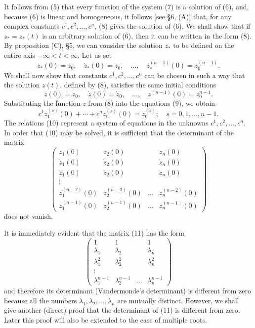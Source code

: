 \documentclass[10pt,a5paper]{book}
\makeatletter
\theoremstyle{plain}
\theoremstyle{definition}
\theoremstyle{remark}
\renewenvironment{proof}[1][\proofname]{\par
  \pushQED{\qed}%
  \normalfont\topsep6\p@\@plus6\p@\relax
  \trivlist
  \item\relax{\itshape #1\@addpunct{.}}\hspace\labelsep\ignorespaces
}{\popQED\endtrivlist\@endpefalse}
\makeatother
\begin{document}
\begin{proof}
It follows from (5) that every function of the system (7) is a solution of (6), and, because (6) is linear and homogeneous, it follows [see §6, (A)] that, for any complex constants $c^{1}, c^{2}, \ldots, c^{n}$, (8) gives the solution of (6). We shall show that if $z_{*}=z_{*}(t)$ is an arbitrary solution of (6), then it can be written in the form (8). By proposition (C), §5, we can consider the solution $z_{*}$ to be defined on the entire axis $-\infty<t<\infty$. Let us set
\[
z_{*}(0)=z_{0}, \quad \dot{z}_{*}(0)=\dot{z}_{0}, \quad \ldots, \quad z_{*}^{(n-1)}(0)=z_{0}^{(n-1)} .
\]
We shall now show that constants $c^{1}, c^{2}, \ldots, c^{n}$ can be chosen in such a way that the solution $z(t)$, defined by (8), satisfies the same initial conditions
\begin{equation*}
z(0)=z_{0}, \quad \dot{z}(0)=\dot{z}_{0}, \quad \ldots, \quad z^{(n-1)}(0)=z_{0}^{n-1} . \tag{9}
\end{equation*}
Substituting the function $z$ from (8) into the equations (9), we obtain
\begin{equation*}
c^{1} z_{1}^{(s)}(0)+\cdots+c^{n} z_{n}^{(s)}(0)=z_{0}^{(s)} ; \quad s=0,1, \ldots, n-1 . \tag{10}
\end{equation*}
The relations (10) represent a system of equations in the unknowns $c^{1}, c^{2}, \ldots, c^{n}$. In order that (10) may be solved, it is sufficient that the
determinant of the matrix
\[
\left(\begin{array}{cccc}
z_{1}(0) & z_{2}(0) & & z_{n}(0)  \tag{11}\\
\dot{z}_{1}(0) & \dot{z}_{2}(0) & & \dot{z}_{n}(0) \\
\ddot{z}_{1}(0) & \ddot{z}_{2}(0) & & \ddot{z}_{n}(0) \\
\vdots & & & \\
z_{1}^{(n-2)}(0) & z_{2}^{(n-2)}(0) & \ldots & z_{n}^{(n-2)}(0) \\
z_{1}^{(n-1)}(0) & z_{2}^{(n-1)}(0) & \ldots & z_{n}^{(n-1)}(0)
\end{array}\right)
\]
does not vanish.

It is immediately evident that the matrix (11) has the form
\[
\left(\begin{array}{cccc}
1 & 1 & & 1 \\
\lambda_{1} & \lambda_{2} & & \lambda_{n} \\
\lambda_{1}^{2} & \lambda_{2}^{2} & & \lambda_{n}^{2} \\
\vdots & & & \\
\lambda_{1}^{n-1} & \lambda_{2}^{n-1} & \ldots & \lambda_{n}^{n-1}
\end{array}\right)
\]
and therefore its determinant (Vandermonde's determinant) is different from zero because all the numbers $\lambda_{1}, \lambda_{2}, \ldots, \lambda_{n}$ are mutually distinct. However, we shall give another (direct) proof that the determinant of (11) is different from zero. Later this proof will also be extended to the case of multiple roots.


\end{proof}
\end{document}
